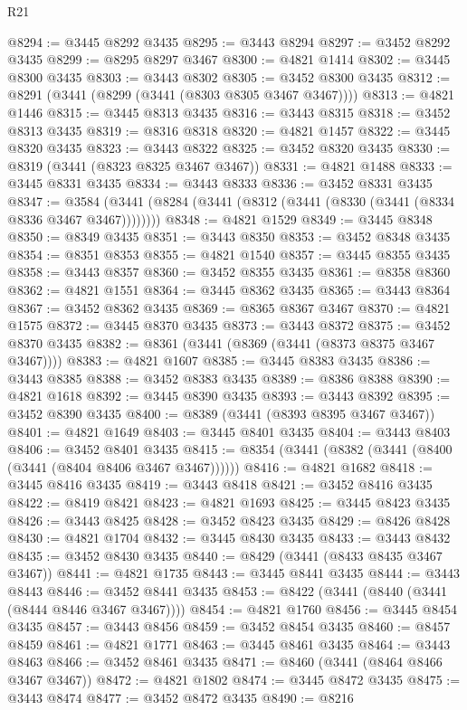 \begin{lexlean}{R21}
\begin{coremodule}
@8294 := @3445 @8292 @3435
@8295 := @3443 @8294
@8297 := @3452 @8292 @3435
@8299 := @8295 @8297 @3467
@8300 := @4821 @1414
@8302 := @3445 @8300 @3435
@8303 := @3443 @8302
@8305 := @3452 @8300 @3435
@8312 := @8291 (@3441 (@8299 (@3441 (@8303 @8305 @3467 @3467))))
@8313 := @4821 @1446
@8315 := @3445 @8313 @3435
@8316 := @3443 @8315
@8318 := @3452 @8313 @3435
@8319 := @8316 @8318
@8320 := @4821 @1457
@8322 := @3445 @8320 @3435
@8323 := @3443 @8322
@8325 := @3452 @8320 @3435
@8330 := @8319 (@3441 (@8323 @8325 @3467 @3467))
@8331 := @4821 @1488
@8333 := @3445 @8331 @3435
@8334 := @3443 @8333
@8336 := @3452 @8331 @3435
@8347 := @3584 (@3441 (@8284 (@3441 (@8312 (@3441 (@8330 (@3441 (@8334 @8336 @3467 @3467))))))))
@8348 := @4821 @1529
@8349 := @3445 @8348
@8350 := @8349 @3435
@8351 := @3443 @8350
@8353 := @3452 @8348 @3435
@8354 := @8351 @8353
@8355 := @4821 @1540
@8357 := @3445 @8355 @3435
@8358 := @3443 @8357
@8360 := @3452 @8355 @3435
@8361 := @8358 @8360
@8362 := @4821 @1551
@8364 := @3445 @8362 @3435
@8365 := @3443 @8364
@8367 := @3452 @8362 @3435
@8369 := @8365 @8367 @3467
@8370 := @4821 @1575
@8372 := @3445 @8370 @3435
@8373 := @3443 @8372
@8375 := @3452 @8370 @3435
@8382 := @8361 (@3441 (@8369 (@3441 (@8373 @8375 @3467 @3467))))
@8383 := @4821 @1607
@8385 := @3445 @8383 @3435
@8386 := @3443 @8385
@8388 := @3452 @8383 @3435
@8389 := @8386 @8388
@8390 := @4821 @1618
@8392 := @3445 @8390 @3435
@8393 := @3443 @8392
@8395 := @3452 @8390 @3435
@8400 := @8389 (@3441 (@8393 @8395 @3467 @3467))
@8401 := @4821 @1649
@8403 := @3445 @8401 @3435
@8404 := @3443 @8403
@8406 := @3452 @8401 @3435
@8415 := @8354 (@3441 (@8382 (@3441 (@8400 (@3441 (@8404 @8406 @3467 @3467))))))
@8416 := @4821 @1682
@8418 := @3445 @8416 @3435
@8419 := @3443 @8418
@8421 := @3452 @8416 @3435
@8422 := @8419 @8421
@8423 := @4821 @1693
@8425 := @3445 @8423 @3435
@8426 := @3443 @8425
@8428 := @3452 @8423 @3435
@8429 := @8426 @8428
@8430 := @4821 @1704
@8432 := @3445 @8430 @3435
@8433 := @3443 @8432
@8435 := @3452 @8430 @3435
@8440 := @8429 (@3441 (@8433 @8435 @3467 @3467))
@8441 := @4821 @1735
@8443 := @3445 @8441 @3435
@8444 := @3443 @8443
@8446 := @3452 @8441 @3435
@8453 := @8422 (@3441 (@8440 (@3441 (@8444 @8446 @3467 @3467))))
@8454 := @4821 @1760
@8456 := @3445 @8454 @3435
@8457 := @3443 @8456
@8459 := @3452 @8454 @3435
@8460 := @8457 @8459
@8461 := @4821 @1771
@8463 := @3445 @8461 @3435
@8464 := @3443 @8463
@8466 := @3452 @8461 @3435
@8471 := @8460 (@3441 (@8464 @8466 @3467 @3467))
@8472 := @4821 @1802
@8474 := @3445 @8472 @3435
@8475 := @3443 @8474
@8477 := @3452 @8472 @3435
@8490 := @8216

\end{coremodule}
\end{lexlean}
